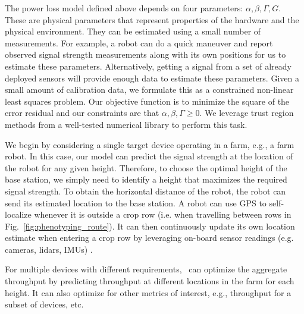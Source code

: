  The power loss model defined above depends on four parameters:  $\alpha,\beta,\Gamma,G$. These are physical parameters that represent properties of the hardware and the physical environment. They can be estimated using a small number of measurements. For example, a robot can do a quick maneuver and report observed signal strength measurements along with its own positions for us to estimate these parameters. Alternatively, getting a signal from a set of already deployed sensors will provide enough data to estimate these parameters. Given a small amount of calibration data, we formulate this as a constrained non-linear least squares problem. Our objective function is to minimize the square of the error residual and our constraints are that $\alpha, \beta, \Gamma \geq 0$. We leverage trust region methods from a well-tested numerical library \cite{2020SciPy-NMeth} to perform this task. %

We begin by considering a single target device operating in a farm, e.g., a farm robot. In this case, our model can predict the signal strength at the location of the robot for any given height. Therefore, to choose the optimal height of the base station, we simply need to identify a height that maximizes the required signal strength. To obtain the horizontal distance of the robot, the robot can send its estimated location to the base station. A robot can use GPS to self-localize whenever it is outside a crop row (i.e. when travelling between rows in Fig.~\ref{fig:phenotyping_route}). It can then continuously update its own location estimate when entering a crop row by leveraging on-board sensor readings (e.g. cameras, lidars, IMUs) \cite{sivakumar_learned_2021, velasquez_multi-sensor_2022, gasparino_cropnav_2023}.

For multiple devices with different requirements, \name\ can optimize the aggregate throughput by predicting throughput at different locations in the farm for each height. It can also optimize for other metrics of interest, e.g., throughput for a subset of devices, etc. 
